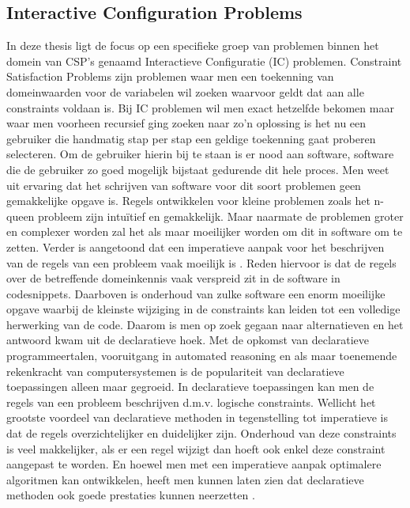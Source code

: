\subsection{Interactive Configuration Problems}
In deze thesis ligt de focus op een specifieke groep van problemen binnen het domein van CSP's genaamd Interactieve Configuratie (IC) problemen. Constraint Satisfaction Problems zijn problemen waar men een toekenning van domeinwaarden voor de variabelen wil zoeken waarvoor geldt dat aan alle constraints voldaan is. Bij IC problemen wil men exact hetzelfde bekomen maar waar men voorheen recursief ging zoeken naar zo'n oplossing is het nu een gebruiker die handmatig stap per stap een geldige toekenning gaat proberen selecteren. Om de gebruiker hierin bij te staan is er nood aan software, software die de gebruiker zo goed mogelijk bijstaat gedurende dit hele proces. Men weet uit ervaring dat het schrijven van software voor dit soort problemen geen gemakkelijke opgave is. Regels ontwikkelen voor kleine problemen zoals het n-queen probleem zijn intu\"{i}tief en gemakkelijk. Maar naarmate de problemen groter en complexer worden zal het als maar moeilijker worden om dit in software om te zetten. Verder is aangetoond dat een imperatieve aanpak voor het beschrijven van de regels van een probleem vaak moeilijk is \citep{gelle1996interactive}. Reden hiervoor is dat de regels over de betreffende domeinkennis vaak verspreid zit in de software in codesnippets. Daarboven is onderhoud van zulke software een enorm moeilijke opgave waarbij de kleinste wijziging in de constraints kan leiden tot een volledige herwerking van de code. Daarom is men op zoek gegaan naar alternatieven en het antwoord kwam uit de declaratieve hoek. Met de opkomst van declaratieve programmeertalen, vooruitgang in automated reasoning en als maar toenemende rekenkracht van computersystemen is de populariteit van declaratieve toepassingen alleen maar gegroeid. In declaratieve toepassingen kan men de regels van een probleem beschrijven d.m.v. logische constraints. Wellicht het grootste voordeel van declaratieve methoden in tegenstelling tot imperatieve is dat de regels overzichtelijker en duidelijker zijn. Onderhoud van deze constraints is veel makkelijker, als er een regel wijzigt dan hoeft ook enkel deze constraint aangepast te worden. En hoewel men met een imperatieve aanpak optimalere algoritmen kan ontwikkelen, heeft men kunnen laten zien dat declaratieve methoden ook goede prestaties kunnen neerzetten \citep{vlaeminck2009logical}. 

